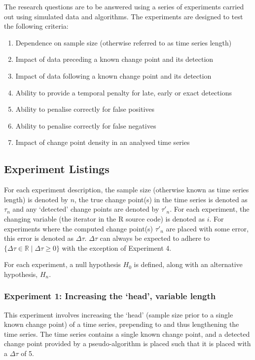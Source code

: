 \documentclass[../main.tex]{subfiles}
\begin{document}
The research questions are to be answered using a series of experiments carried out using simulated data and algorithms. The experiments are designed to test the following criteria:

\begin{enumerate}
    \item Dependence on sample size (otherwise referred to as time series length)
    \item Impact of data preceding a known change point and its detection
    \item Impact of data following a known change point and its detection
    \item Ability to provide a temporal penalty for late, early or exact detections
    \item Ability to penalise correctly for false positives
    \item Ability to penalise correctly for false negatives
    \item Impact of change point density in an analysed time series
\end{enumerate}

\subsection{Experiment Listings}

For each experiment description, the sample size (otherwise known as time series length) is denoted by $n$, the true change point(s) in the time series is denoted as $\tau_n$ and any `detected' change points are denoted by $\tau'_{n}$. For each experiment, the changing variable (the iterator in the \textsf{R} source code) is denoted as $i$. For experiments where the computed change point(s) $\tau'_n$ are placed with some error, this error is denoted as $\Delta \tau$. $\Delta \tau$ can always be expected to adhere to $\{ \Delta \tau \in \mathbb{R} \mid \Delta \tau \geq 0 \}$ with the exception of Experiment 4.

For each experiment, a null hypothesis $H_0$ is defined, along with an alternative hypothesis, $H_n$.

\subsubsection{Experiment 1: Increasing the `head', variable length}

This experiment involves increasing the `head' (sample size prior to a single known change point) of a time series, prepending to and thus lengthening the time series. The time series contains a single known change point, and a detected change point provided by a pseudo-algorithm is placed such that it is placed with a $\Delta \tau$ of 5.
\end{document}
